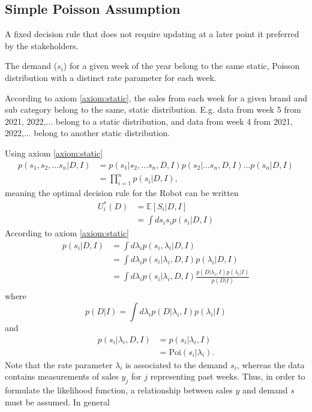\subsection{Simple Poisson Assumption}
A fixed decision rule that does not require updating at a later point it preferred by the stakeholders.

\begin{axiom}
	\label{axiom:static}
	The demand ($s_i$) for a given week of the year belong to the same static, Poisson distribution with a distinct rate parameter for each week. 
\end{axiom}

\begin{example}
	According to axiom \ref{axiom:static}, the sales from each week for a given brand and sub category belong to the same, static distribution. E.g. data from week 5 from 2021, 2022,... belong to a static distribution, and data from week 4 from 2021, 2022,... belong to another static distribution.
\end{example}

Using axiom \ref{axiom:static} 
\begin{equation}
	\begin{split}
		p(s_1,s_2,\dots s_n|D,I) &= p(s_1|s_2,\dots s_n,D,I)p(s_2|\dots s_n,D,I)\dots p(s_n|D,I)\\
		& = \prod_{i=1}^np(s_i|D,I),
	\end{split}
\end{equation}
meaning the optimal decision rule for the Robot can be written
\begin{equation}
	\begin{split}
		U_i^*(D) &= \mathbb{E}[S_i|D,I] \\
		& = \int d s_i s_ip(s_i|D,I)
	\end{split}
\end{equation}
According to axiom \ref{axiom:static}
\begin{equation}
	\begin{split}
		p(s_i|D,I)&=\int d\lambda_i p(s_i,\lambda_i|D,I)\\
		&=\int d\lambda_i p(s_i|\lambda_i,D,I)p(\lambda_i|D,I)\\
		&=\int d\lambda_i p(s_i|\lambda_i,D,I)\frac{p(D|\lambda_i,I)p(\lambda_i|I)}{p(D|I)}\\
	\end{split}
\end{equation}
where 
\begin{equation}
	p(D|I) = \int d\lambda_i p(D|\lambda_i,I)p(\lambda_i|I)
\end{equation}
and
\begin{equation}
	\begin{split}
		p(s_i|\lambda_i,D,I) & = p(s_i|\lambda_i,I)\\
		& = \text{Poi}(s_i|\lambda_i).
	\end{split}
\end{equation}
Note that the rate parameter $\lambda_i$ is associated to the demand $s_i$, whereas the data contains measurements of sales $y_j$ for $j$ representing past weeks. Thus, in order to formulate the likelihood function, a relationship between sales $y$ and demand $s$ must be assumed. In general

